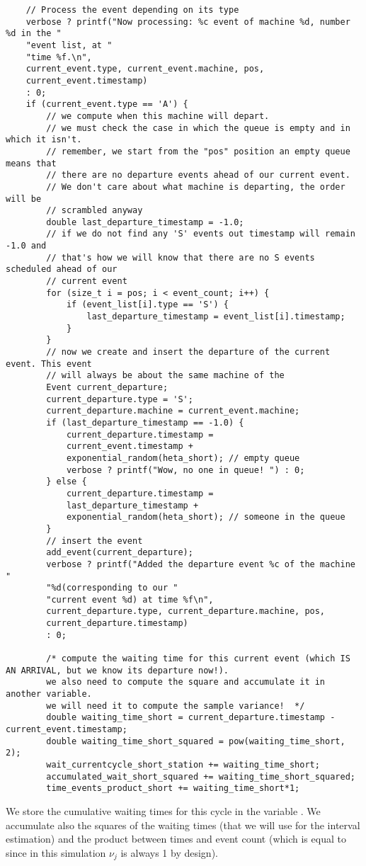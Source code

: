 \documentclass[12pt]{article}
\begin{document}
\begin{lstlisting}
	// Process the event depending on its type
	verbose ? printf("Now processing: %c event of machine %d, number %d in the "
	"event list, at "
	"time %f.\n",
	current_event.type, current_event.machine, pos,
	current_event.timestamp)
	: 0;
	if (current_event.type == 'A') {
		// we compute when this machine will depart.
		// we must check the case in which the queue is empty and in which it isn't.
		// remember, we start from the "pos" position an empty queue means that
		// there are no departure events ahead of our current event.
		// We don't care about what machine is departing, the order will be
		// scrambled anyway
		double last_departure_timestamp = -1.0;
		// if we do not find any 'S' events out timestamp will remain -1.0 and
		// that's how we will know that there are no S events scheduled ahead of our
		// current event
		for (size_t i = pos; i < event_count; i++) {
			if (event_list[i].type == 'S') {
				last_departure_timestamp = event_list[i].timestamp;
			}
		}
		// now we create and insert the departure of the current event. This event
		// will always be about the same machine of the
		Event current_departure;
		current_departure.type = 'S';
		current_departure.machine = current_event.machine;
		if (last_departure_timestamp == -1.0) {
			current_departure.timestamp =
			current_event.timestamp +
			exponential_random(heta_short); // empty queue
			verbose ? printf("Wow, no one in queue! ") : 0;
		} else {
			current_departure.timestamp =
			last_departure_timestamp +
			exponential_random(heta_short); // someone in the queue
		}
		// insert the event
		add_event(current_departure);
		verbose ? printf("Added the departure event %c of the machine "
		"%d(corresponding to our "
		"current event %d) at time %f\n",
		current_departure.type, current_departure.machine, pos,
		current_departure.timestamp)
		: 0;
		
		/* compute the waiting time for this current event (which IS AN ARRIVAL, but we know its departure now!).
		we also need to compute the square and accumulate it in another variable.
		we will need it to compute the sample variance!  */
		double waiting_time_short = current_departure.timestamp - current_event.timestamp;
		double waiting_time_short_squared = pow(waiting_time_short, 2);
		wait_currentcycle_short_station += waiting_time_short;
		accumulated_wait_short_squared += waiting_time_short_squared;
		time_events_product_short += waiting_time_short*1;
	\end{lstlisting}
We store the cumulative waiting times for this cycle in the variable . We accumulate also the squares of the waiting times (that we will use for the interval estimation) and the product between times and event count (which is equal to  since in this simulation $\nu_j$ is always 1 by design).\\
\end{document}
